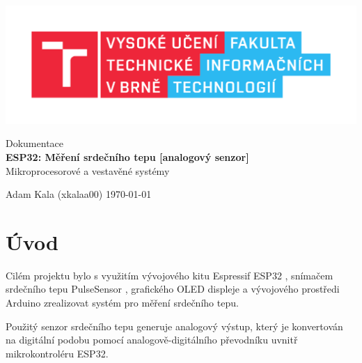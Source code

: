 \documentclass[11.5pt]{article}
\begin{document}
	\begin{titlepage}
		\begin{center}
			\includegraphics[width=0.77\linewidth]{pic/FIT_logo.pdf} \\


			\Huge{Dokumentace} \\
			\LARGE{\textbf{
				ESP32: Měření srdečního tepu [analogový senzor]
			}} \\
			\Large{Mikroprocesorové a vestavěné systémy}

		\end{center}

		{\Large            
            Adam Kala (xkalaa00)
            \hfill
            \today
		}
	\end{titlepage}



         \tableofcontents
	\clearpage



	
	\section{Úvod}
	\setcounter{page}{1}
        Cilém projektu bylo s využitím vývojového kitu Espressif ESP32 \cite{esp32}, snímačem srdečního tepu PulseSensor \cite{snimac}, grafického OLED displeje \cite{displej}
        a vývojového prostředi Arduino zrealizovat systém pro měření srdečního tepu. 

        Použitý senzor srdečního tepu generuje analogový výstup, který je konvertován na digitální podobu pomocí analogově-digitálního převodníku uvnitř mikrokontroléru ESP32. 
\end{document}
